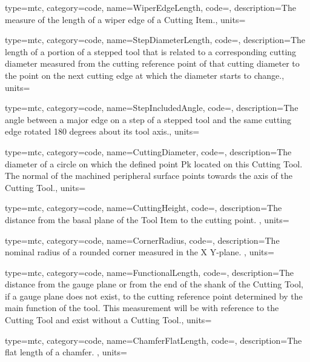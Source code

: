 {
  type=mtc,
  category=code,
  name={WiperEdgeLength},
  code=,
  description={The measure of the length of a wiper edge of a Cutting Item.},
  units=
}

{
  type=mtc,
  category=code,
  name={StepDiameterLength},
  code=,
  description={The length of a portion of a stepped tool that is related to a corresponding cutting diameter measured from the cutting reference point of that cutting diameter to the point on the next cutting edge at which the diameter starts to change.},
  units=
}

{
  type=mtc,
  category=code,
  name={StepIncludedAngle},
  code=,
  description={The angle between a major edge on a step of a stepped tool and the same cutting edge rotated 180 degrees about its tool axis.},
  units=
}

{
  type=mtc,
  category=code,
  name={CuttingDiameter},
  code=,
  description={The diameter of a circle on which the defined point Pk located on this Cutting Tool. The normal of the machined peripheral surface points towards the axis of the Cutting Tool.},
  units=
}

{
  type=mtc,
  category=code,
  name={CuttingHeight},
  code=,
  description={The distance from the basal plane of the Tool Item to the cutting point. },
  units=
}

{
  type=mtc,
  category=code,
  name={CornerRadius},
  code=,
  description={The nominal radius of a rounded corner measured in the X Y-plane. },
  units=
}

{
  type=mtc,
  category=code,
  name={FunctionalLength},
  code=,
  description={The distance from the gauge plane or from the end of the shank of the Cutting Tool, if a gauge plane does not exist, to the cutting reference point determined by the main function of the tool. This measurement will be with reference to the Cutting Tool and \MUSTNOT exist without a Cutting Tool.},
  units=
}

{
  type=mtc,
  category=code,
  name={ChamferFlatLength},
  code=,
  description={The flat length of a chamfer. },
  units=
}

